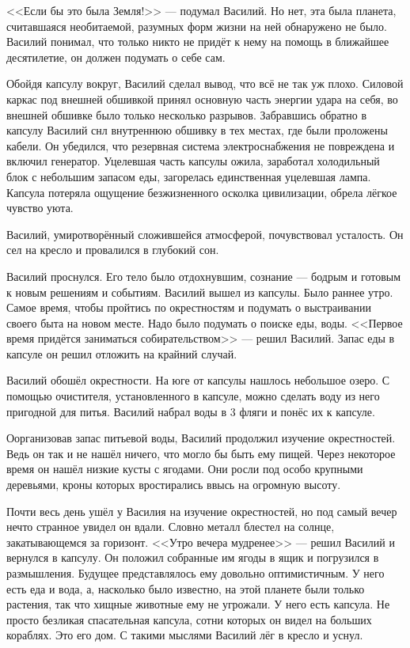 \documentclass[12pt]{article}
\begin{document}
<<Если бы это была Земля!>> --- подумал Василий. Но нет, эта была планета,
считавшаяся необитаемой, разумных форм жизни на ней обнаружено не было.
Василий понимал, что только никто не придёт к нему на помощь в ближайшее
десятилетие, он должен подумать о себе сам.

Обойдя капсулу вокруг, Василий сделал вывод, что всё не так уж плохо.
Силовой каркас под внешней обшивкой принял основную часть энергии удара на
себя, во внешней обшивке было только несколько разрывов. Забравшись обратно
в капсулу Василий снл внутреннюю обшивку в тех местах, где были проложены
кабели. Он убедился, что резервная система электроснабжения не повреждена
и включил генератор. Уцелевшая часть капсулы ожила, заработал холодильный
блок с небольшим запасом еды, загорелась единственная уцелевшая лампа.
Капсула потеряла ощущение безжизненного осколка цивилизации, обрела лёгкое
чувство уюта.

Василий, умиротворённый сложившейся атмосферой, почувствовал усталость.
Он сел на кресло и провалился в глубокий сон.


Василий проснулся. Его тело было отдохнувшим, сознание --- бодрым и готовым
к новым решениям и событиям. Василий вышел из капсулы. Было раннее утро.
Самое время, чтобы пройтись по окрестностям и подумать о выстраивании
своего быта на новом месте. Надо было подумать о поиске еды, воды.
<<Первое время придётся заниматься собирательством>> --- решил Василий.
Запас еды в капсуле он решил отложить на крайний случай.

Василий обошёл окрестности. На юге от капсулы нашлось небольшое озеро.
С помощью очистителя, установленного в капсуле, можно сделать воду из него
пригодной для питья. Василий набрал воды в 3 фляги и понёс их к капсуле.

Оорганизовав запас питьевой воды, Василий продолжил изучение окрестностей.
Ведь он так и не нашёл ничего, что могло бы быть ему пищей. Через некоторое
время он нашёл низкие кусты с ягодами. Они росли под особо крупными деревьями,
кроны которых вростирались ввысь на огромную высоту.

Почти весь день ушёл у Василия на изучение окрестностей, но под самый
вечер нечто странное
увидел он вдали. Словно металл блестел на солнце, закатывающемся за горизонт.
<<Утро вечера мудренее>> --- решил Василий и вернулся в капсулу. Он положил
собранные им ягоды в ящик и погрузился в размышления. Будущее представлялось
ему довольно оптимистичным. У него есть еда и вода, а, насколько было
известно, на этой планете были только растения, так что хищные животные ему не
угрожали. У него есть капсула. Не просто безликая спасательная капсула,
сотни которых он видел на больших кораблях. Это его дом. С такими мыслями
Василий лёг в кресло и уснул.
\end{document}
